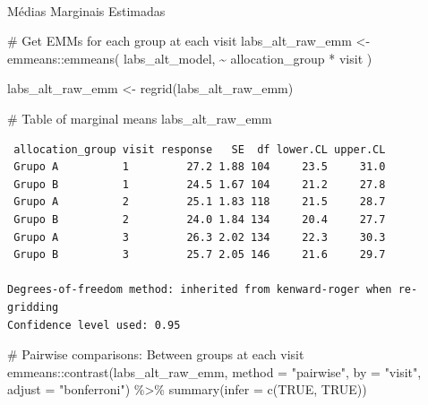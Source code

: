 \documentclass[
  letterpaper,
  DIV=11,
  numbers=noendperiod]{scrartcl}
\makeatletter
\let\oldparagraph\paragraph
\renewcommand{\paragraph}{
    \@ifstar
      \xxxParagraphStar
      \xxxParagraphNoStar
  }
\newcommand{\xxxParagraphStar}[1]{\oldparagraph*{#1}\mbox{}}
\newcommand{\xxxParagraphNoStar}[1]{\oldparagraph{#1}\mbox{}}
\newenvironment{Shaded}{\begin{snugshade}}{\end{snugshade}}
\newcommand{\AttributeTok}[1]{\textcolor[rgb]{0.40,0.45,0.13}{#1}}
\newcommand{\CommentTok}[1]{\textcolor[rgb]{0.37,0.37,0.37}{#1}}
\newcommand{\ConstantTok}[1]{\textcolor[rgb]{0.56,0.35,0.01}{#1}}
\newcommand{\FunctionTok}[1]{\textcolor[rgb]{0.28,0.35,0.67}{#1}}
\newcommand{\NormalTok}[1]{\textcolor[rgb]{0.00,0.23,0.31}{#1}}
\newcommand{\OtherTok}[1]{\textcolor[rgb]{0.00,0.23,0.31}{#1}}
\newcommand{\SpecialCharTok}[1]{\textcolor[rgb]{0.37,0.37,0.37}{#1}}
\newcommand{\StringTok}[1]{\textcolor[rgb]{0.13,0.47,0.30}{#1}}
\makeatother
\begin{document}
\paragraph{Médias Marginais
Estimadas}\label{muxe9dias-marginais-estimadas-1}

\begin{Shaded}
\begin{Highlighting}[]
\CommentTok{\# Get EMMs for each group at each visit}
\NormalTok{labs\_alt\_raw\_emm }\OtherTok{\textless{}{-}}\NormalTok{ emmeans}\SpecialCharTok{::}\FunctionTok{emmeans}\NormalTok{(}
\NormalTok{    labs\_alt\_model, }
    \SpecialCharTok{\textasciitilde{}}\NormalTok{ allocation\_group }\SpecialCharTok{*}\NormalTok{ visit}
\NormalTok{)}

\NormalTok{labs\_alt\_raw\_emm }\OtherTok{\textless{}{-}} \FunctionTok{regrid}\NormalTok{(labs\_alt\_raw\_emm)}

\CommentTok{\# Table of marginal means}
\NormalTok{labs\_alt\_raw\_emm}
\end{Highlighting}
\end{Shaded}

\begin{verbatim}
 allocation_group visit response   SE  df lower.CL upper.CL
 Grupo A          1         27.2 1.88 104     23.5     31.0
 Grupo B          1         24.5 1.67 104     21.2     27.8
 Grupo A          2         25.1 1.83 118     21.5     28.7
 Grupo B          2         24.0 1.84 134     20.4     27.7
 Grupo A          3         26.3 2.02 134     22.3     30.3
 Grupo B          3         25.7 2.05 146     21.6     29.7

Degrees-of-freedom method: inherited from kenward-roger when re-gridding 
Confidence level used: 0.95 
\end{verbatim}

\begin{Shaded}
\begin{Highlighting}[]
\CommentTok{\# Pairwise comparisons: Between groups at each visit}
\NormalTok{emmeans}\SpecialCharTok{::}\FunctionTok{contrast}\NormalTok{(labs\_alt\_raw\_emm, }\AttributeTok{method =} \StringTok{"pairwise"}\NormalTok{, }\AttributeTok{by =} \StringTok{"visit"}\NormalTok{, }\AttributeTok{adjust =} \StringTok{"bonferroni"}\NormalTok{) }\SpecialCharTok{\%\textgreater{}\%} \FunctionTok{summary}\NormalTok{(}\AttributeTok{infer =} \FunctionTok{c}\NormalTok{(}\ConstantTok{TRUE}\NormalTok{, }\ConstantTok{TRUE}\NormalTok{))}
\end{Highlighting}
\end{Shaded}
\end{document}
